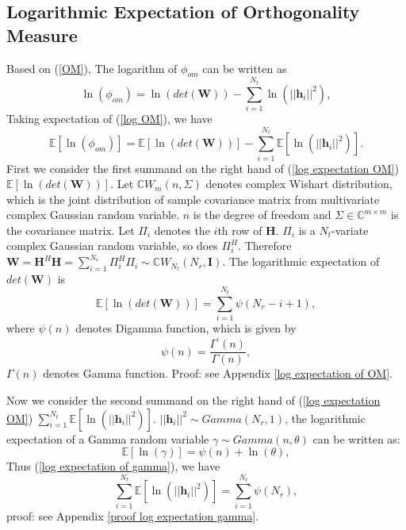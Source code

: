 \documentclass[12pt, draftclsnofoot, onecolumn]{IEEEtran}
\begin{document}
\subsection{Logarithmic Expectation of Orthogonality Measure}
Based on (\ref{OM}), The logarithm of $\phi_{om}$ can be written as 
\begin{equation}
\ln(\phi_{om})=\ln(det(\mathbf{W}))-\sum_{i=1}^{N_{t}}\ln(||\mathbf{h}_{i}||^{2}),
\label{log OM}
\end{equation}
Taking expectation of (\ref{log OM}), we have 
\begin{equation}
\mathbb{E}[\ln(\phi_{om})]=\mathbb{E}[\ln(det(\mathbf{W}))]-\sum_{i=1}^{N_{t}}\mathbb{E}[\ln(||\mathbf{h}_{i}||^{2})].
\label{log expectation OM}
\end{equation}
First we consider the first summand on the right hand of (\ref{log expectation OM}) $\mathbb{E}[\ln(det(\mathbf{W}))]$. Let $\mathbb{C}W_{m}(n, \Sigma)$ denotes complex Wishart distribution, which is the joint distribution of sample covariance matrix from multivariate complex Gaussian random variable\cite{goodman1963statistical}. $n$ is the degree of freedom and $\Sigma\in \mathbb{C}^{m\times m}$ is the covariance matrix. Let $\Pi_{i}$ denotes the $i$th row of $\mathbf{H}$. $\Pi_{i}$ is a $N_{t}$-variate complex Gaussian random variable, so does $\Pi_{i}^{H}$. Therefore $\mathbf{W}=\mathbf{H}^{H}\mathbf{H}=\sum_{i=1}^{N_{r}}\Pi_{i}^{H}\Pi_{i}\sim \mathbb{C}W_{N_{t}}(N_{r}, \mathbf{I})$. The logarithmic expectation of $det(\mathbf{W})$ is
\begin{equation}
\mathbb{E}[\ln(det(\mathbf{W}))]=\sum_{i=1}^{N_{t}}\psi(N_{r}-i+1),
\label{log expectation of wishart}
\end{equation}
where $\psi(n)$ denotes Digamma function, which is given by\cite{papoulis2002probability}
\begin{equation}
\psi(n)=\frac{\Gamma^{'}(n)}{\Gamma(n)},
\label{Digmma function}
\end{equation}
$\Gamma(n)$ denotes Gamma function.
Proof: see Appendix \ref{log expectation of OM}.

Now we consider the second summand on the right hand of (\ref{log expectation OM}) $\sum_{i=1}^{N_{t}}\mathbb{E}[\ln(||\mathbf{h}_{i}||^{2})]$. $||\mathbf{h}_{i}||^{2}\sim Gamma(N_{r}, 1)$, the logarithmic expectation of a Gamma random variable $\gamma\sim Gamma(n, \theta)$ can be written as:
\begin{equation}
\mathbb{E}[\ln(\gamma)]=\psi(n)+\ln(\theta),
\label{log expectation of gamma}
\end{equation}
Thus (\ref{log expectation of gamma}), we have
\begin{equation}
\sum_{i=1}^{N_{t}}\mathbb{E}[\ln(||\mathbf{h}_{i}||^{2})]=\sum_{i=1}^{N_{t}}\psi(N_{r}),
\label{sum of log expectation gamma}
\end{equation}
proof: see Appendix \ref{proof log expectation gamma}.
\end{document}
